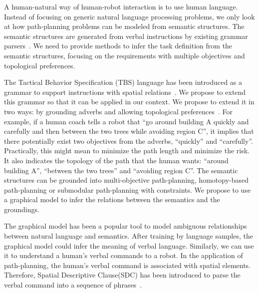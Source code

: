 \documentclass[phd]{byuprop}
\begin{document}
A human-natural way of human-robot interaction is to use human language.
Instead of focusing on generic natural language processing problems, we only look at how path-planning problems can be modeled from semantic structures.
The semantic structures are generated from verbal instructions by existing grammar parsers~\cite{Kollar:2010:TUN:1734454.1734553}.
We need to provide methods to infer the task definition from the semantic structures, focusing on the requirements with multiple objectives and topological preferences.

The Tactical Behavior Specification (TBS) language has been introduced as a grammar to support instructions with spatial relations~\cite{Boularias_2015_7953}.
We propose to extend this grammar so that it can be applied in our context.
We propose to extend it in two ways: by grounding adverbs and allowing topological preferences~\cite{Yi2014}.
For example, if a human coach tells a robot that ``go around building A quickly and carefully and then between the two trees while avoiding region C'',
it implies that there potentially exist two objectives from the adverbs, ``quickly'' and ``carefully''.
Practically, this might mean to minimize the path length and minimize the risk.
It also indicates the topology of the path that the human wants: ``around building A'', ``between the two trees'' and ``avoiding region C''.
The semantic structures can be grounded into multi-objective path-planning, homotopy-based path-planning or submodular path-planning with constraints.
We propose to use a graphical model to infer the relations between the semantics and the groundings.

The graphical model has been a popular tool to model ambiguous relationships between natural language and semantics.
After training by language samples, the graphical model could infer the meaning of verbal language.
Similarly, we can use it to understand a human's verbal commands to a robot.
In the application of path-planning, the human's verbal command is associated with spatial elements. 
Therefore, Spatial Descriptive Clause(SDC) has been introduced to parse the verbal command into a sequence of phrases~\cite{Kollar:2010:TUN:1734454.1734553}.
\end{document}
